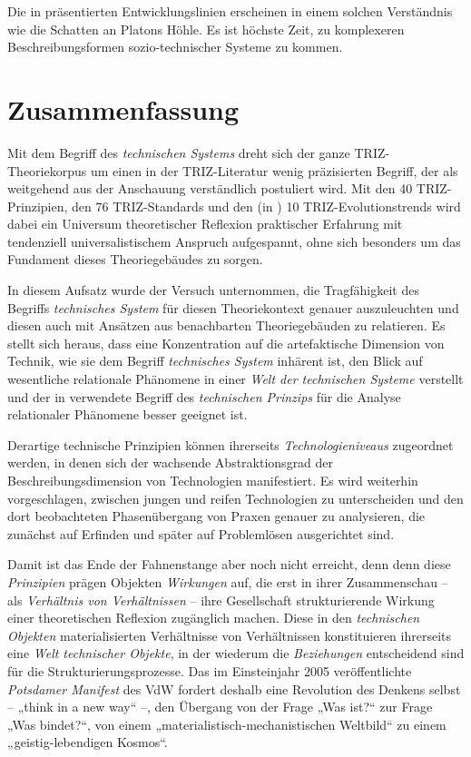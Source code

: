 \documentclass[11pt,a4paper]{article}
\begin{document}
Die in \cite{TESE2018} präsentierten Entwicklungslinien erscheinen in einem
solchen Verständnis wie die Schatten an Platons Höhle. Es ist höchste Zeit, zu
komplexeren Beschreibungsformen sozio-technischer Systeme zu kommen.

\section{Zusammenfassung}

Mit dem Begriff des \emph{technischen Systems} dreht sich der ganze
TRIZ-Theoriekorpus um einen in der TRIZ-Literatur wenig präzisierten Begriff,
der als weitgehend aus der Anschauung verständlich postuliert wird. Mit den 40
TRIZ-Prinzipien, den 76 TRIZ-Standards und den (in \cite{TESE2018}) 10
TRIZ-Evolutionstrends wird dabei ein Universum theoretischer Reflexion
praktischer Erfahrung mit tendenziell universalistischem Anspruch aufgespannt,
ohne sich besonders um das Fundament dieses Theoriegebäudes zu sorgen. 

In diesem Aufsatz wurde der Versuch unternommen, die Tragfähigkeit des
Begriffs \emph{technisches System} für diesen Theoriekontext genauer
auszuleuchten und diesen auch mit Ansätzen aus benachbarten Theoriegebäuden zu
relatieren.  Es stellt sich heraus, dass eine Konzentration auf die
artefaktische Dimension von Technik, wie sie dem Begriff  \emph{technisches
  System} inhärent ist, den Blick auf wesentliche relationale Phänomene in
einer \emph{Welt der technischen Systeme} verstellt und der in
\cite{Shpakovsky2010} verwendete Begriff des \emph{technischen Prinzips} für
die Analyse relationaler Phänomene besser geeignet ist.

Derartige technische Prinzipien können ihrerseits \emph{Technologieniveaus}
zugeordnet werden, in denen sich der wachsende Abstraktionsgrad der
Beschreibungsdimension von Technologien manifestiert.  Es wird weiterhin
vorgeschlagen, zwischen jungen und reifen Technologien zu unterscheiden und
den dort beobachteten Phasenübergang von Praxen genauer zu analysieren, die
zunächst auf Erfinden und später auf Problemlösen ausgerichtet sind. 

Damit ist das Ende der Fahnenstange aber noch nicht erreicht, denn denn diese
\emph{Prinzipien} prägen Objekten \emph{Wirkungen} auf, die erst in ihrer
Zusammenschau -- als \emph{Verhältnis von Verhältnissen} -- ihre Gesellschaft
strukturierende Wirkung einer theoretischen Reflexion zugänglich machen.
Diese in den \emph{technischen Objekten} materialisierten Verhältnisse von
Verhältnissen konstituieren ihrerseits eine \emph{Welt technischer Objekte},
in der wiederum die \emph{Beziehungen} entscheidend sind für die
Strukturierungsprozesse.  Das im Einsteinjahr 2005 veröffentlichte
\emph{Potsdamer Manifest} \cite{Duerr2005} des VdW fordert deshalb eine
Revolution des Denkens selbst -- „think in a new way“ --, den Übergang von der
Frage „Was ist?“ zur Frage „Was bindet?“, von einem
„materialistisch-mechanistischen Weltbild“ zu einem „geistig-lebendigen
Kosmos“.
\end{document}
